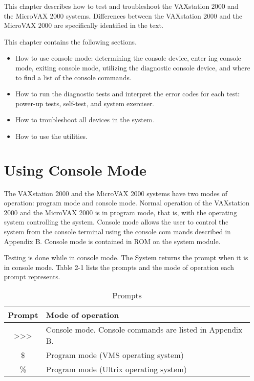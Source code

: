 \documentclass{decsectional}
\begin{document}
This chapter describes how to test and troubleshoot the VAXstation 2000
and the MicroVAX 2000 systems. Differences between the VAXstation 2000
and the MicroVAX 2000 are specifically identified in the text.

This chapter contains the following sections.

\begin{itemize}
\item How to use console mode: determining the console device, enter
ing console mode, exiting console mode, utilizing the diagnostic
console device, and where to find a list of the console commands.
\item How to run the diagnostic tests and interpret the error codes for
each test: power-up tests, self-test, and system exerciser.
\item How to troubleshoot all devices in the system.
\item How to use the utilities.
\end{itemize}

\section{Using Console Mode}

The VAXstation 2000 and the MicroVAX 2000 systems have two modes
of operation: program mode and console mode. Normal operation of the
VAXstation 2000 and the MicroVAX 2000 is in program mode, that is, with
the operating system controlling the system. Console mode allows the user
to control the system from the console terminal using the console com
mands described in Appendix B. Console mode is contained in ROM on
the system module.

Testing is done while in console mode. The System returns the \console
prompt when it is in console mode. Table 2-1 lists the prompts and the
mode of operation each prompt represents.

\begin{table}[H]
\caption{Prompts}
\label{table:1}
\begin{tabularx}{\textwidth}{c l}
\hline
\textbf{Prompt} & \textbf{Mode of operation}\\
\hline
{>}{>}{>} & Console mode. Console commands are listed in Appendix B. \\
\$ & Program mode (VMS operating system) \\
\% & Program mode (Ultrix operating system) \\
\hline
\end{tabularx}
\end{table}
\end{document}
